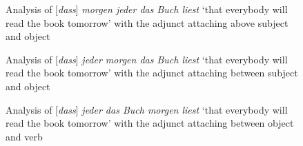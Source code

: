 \begin{figure}
\caption{\label{fig-m-j-b-l}Analysis of [\emph{dass}] \emph{morgen jeder das Buch liest} `that everybody will read the
  book tomorrow' with the adjunct attaching above subject and object}
\end{figure}


\begin{figure}

\caption{\label{fig-j-m-b-l}Analysis of [\emph{dass}] \emph{jeder morgen das Buch liest} `that everybody will read the
  book tomorrow' with the adjunct attaching between subject and object}
\end{figure}


\begin{figure}
\caption{\label{fig-j-b-m-l}Analysis of [\emph{dass}] \emph{jeder das Buch morgen liest} `that everybody will read the
  book tomorrow' with the adjunct attaching between object and verb}
\end{figure}

